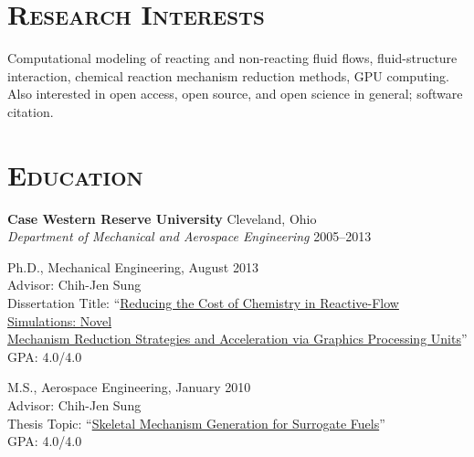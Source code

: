 \documentclass[margin,line,11pt]{res}
\newenvironment{list1}{
  \begin{list}{\ding{113}}{%
      \setlength{\itemsep}{0in}
      \setlength{\parsep}{0in} \setlength{\parskip}{0in}
      \setlength{\topsep}{0in} \setlength{\partopsep}{0in}
      \setlength{\leftmargin}{0.17in}}}{\end{list}}
\begin{document}

\address{\href{http://mime.oregonstate.edu}{School of Mechanical, Industrial, \& Manufacturing Engineering}, \href{http://oregonstate.edu}{Oregon State University}}
\address{320 Rogers Hall, Corvallis, OR 97331-6001 USA}
\address{+1-541-737-5614 | \href{mailto:Kyle.Niemeyer@oregonstate.edu}{Kyle.Niemeyer@oregonstate.edu}}
\address{\url{http://kyleniemeyer.com} | ORCID: \href{http://orcid.org/0000-0003-4425-7097}{0000-0003-4425-7097}}

\begin{resume}

\section{\textsc{Research Interests}}
Computational modeling of reacting and non-reacting fluid flows, fluid-structure interaction, chemical reaction mechanism reduction methods, GPU computing.
Also interested in open access, open source, and open science in general; software citation.


\section{\textsc{Education}}
\textbf{Case Western Reserve University} \hfill Cleveland, Ohio \\
\emph{Department of Mechanical and Aerospace Engineering} \hfill 2005--2013 \\
\begin{list1}

\item[] Ph.D., Mechanical Engineering, August 2013 \\
Advisor:  Chih-Jen Sung \\
Dissertation Title: ``\href{http://kyleniemeyer.com/files/Niemeyer_dissertation.pdf}{Reducing the Cost of Chemistry in Reactive-Flow Simulations: Novel} \\ \href{http://kyleniemeyer.com/files/Niemeyer_dissertation.pdf}{Mechanism Reduction Strategies and Acceleration via Graphics Processing Units}'' \\
GPA: 4.0\slash 4.0 \\

\item[] M.S., Aerospace Engineering,  January 2010 \\
Advisor: Chih-Jen Sung \\
Thesis Topic:  ``\href{http://kyleniemeyer.com/files/Niemeyer_thesis.pdf}{Skeletal Mechanism Generation for Surrogate Fuels}'' \\
GPA: 4.0\slash 4.0 \\


\end{list1}
\end{resume}
\end{document}
